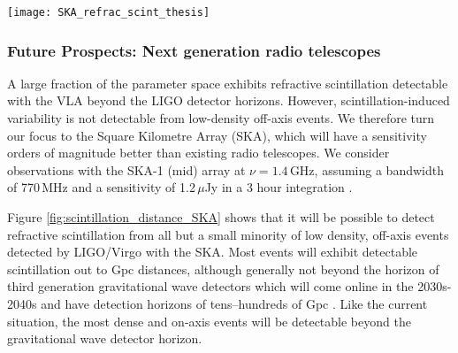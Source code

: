 \begin{figure*}[h!]
\texttt{[image: SKA\_refrac\_scint\_thesis]}
\caption[Detectability of refractive scintillation with the SKA]{Maximum distance at which refractive scintillation is detectable with the Square Kilometre Array for a range of electron density parameters. Left: typical scintillation parameters at low Galactic latitudes ($10\arcdeg<|b|<20\arcdeg$), $\nu_0 = 18.1$\,GHz and $\theta_{F0} = 1.5\,\mu$as. Middle: $\nu_0 = 10.3$\,GHz and $\theta_{F0} = 2.9\,\mu$as corresponding to the line of sight to GW170817. Right: typical scintillation parameters at high Galactic latitudes ($60\arcdeg<|b|<70\arcdeg$), $\nu_0 = 7.82$\,GHz and $\theta_{F0} = 3.9\,\mu$as. Contours corresponding to the inclination angle dependent LIGO horizon for O3 (135\,Mpc, solid), design specifications (190\,Mpc, dashed), and A+ (330\,Mpc, dotted) are shown in blue. The blue cross corresponds to the typical short GRB circum-merger density and estimates for the inclination angle of GW170817.}
\label{fig:scintillation_distance_SKA}
\end{figure*}


\subsubsection{Future Prospects: Next generation radio telescopes}
\label{subsec:scint_SKA}
\vspace{-6pt}
A large fraction of the parameter space exhibits refractive scintillation detectable with the VLA beyond the LIGO detector horizons. However, scintillation-induced variability is not detectable from low-density off-axis events. We therefore turn our focus to the Square Kilometre Array (SKA), which will have a sensitivity orders of magnitude better than existing radio telescopes. We consider observations with the SKA-1 (mid) array at $\nu=1.4\,$GHz, assuming a bandwidth of 770\,MHz and a sensitivity of 1.2\,$\mu$Jy in a 3 hour integration \citep{2019arXiv191212699B}.

Figure \ref{fig:scintillation_distance_SKA} shows that it will be possible to detect refractive scintillation from all but a small minority of low density, off-axis events detected by LIGO/Virgo with the SKA. Most events will exhibit detectable scintillation out to Gpc distances, although generally not beyond the horizon of third generation gravitational wave detectors which will come online in the 2030s-2040s \citep{2019BAAS...51g..35R} and have detection horizons of tens--hundreds of Gpc \citep{2013CQGra..30g9501S}. Like the current situation, the most dense and on-axis events will be detectable beyond the gravitational wave detector horizon.

